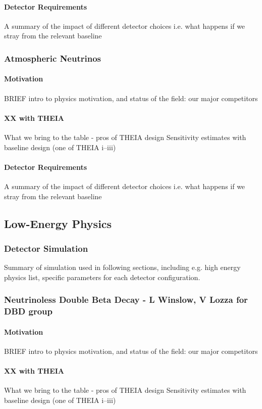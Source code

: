 \documentclass[11pt,prd,letterpaper,amsmath,amssymb,final,nofootinbib
,unsortedaddress,superscriptaddress
]{revtex4-1}
\begin{document}
\paragraph{Detector Requirements}
A summary of the impact of different detector choices i.e. what happens if we stray from the relevant baseline
\subsubsection{Atmospheric Neutrinos}
\paragraph{Motivation}
BRIEF intro to physics motivation, and status of the field: our major competitors
\paragraph{XX with THEIA}
What we bring to the table - pros of THEIA design \newline
Sensitivity estimates with baseline design (one of THEIA i--iii)
\paragraph{Detector Requirements}
A summary of the impact of different detector choices i.e. what happens if we stray from the relevant baseline

\subsection{Low-Energy Physics}
\subsubsection{Detector Simulation}
Summary of simulation used in following sections, including e.g. high energy physics list, specific parameters for each detector configuration.
\subsubsection{Neutrinoless Double Beta Decay - L Winslow, V Lozza for DBD group}
\paragraph{Motivation}
BRIEF intro to physics motivation, and status of the field: our major competitors
\paragraph{XX with THEIA}
What we bring to the table - pros of THEIA design \newline
Sensitivity estimates with baseline design (one of THEIA i--iii)
\end{document}
